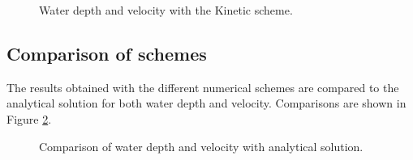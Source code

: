 \begin{figure}[H]
\begin{minipage}[t]{0.5\textwidth}
 \centering
\end{minipage}
\begin{minipage}[t]{0.5\textwidth}
 \centering
\end{minipage}
  \caption{Water depth and velocity with the Kinetic scheme.}
  \label{fig:stoker:firstobs1d}
\end{figure}

\subsection{Comparison of schemes}

The results obtained with the different numerical schemes are compared to the
analytical solution for both water depth and velocity.
Comparisons are shown in Figure \ref{fig:stoker:comparison}.

\begin{figure}[H]
\begin{minipage}[t]{0.5\textwidth}
 \centering
\end{minipage}
\begin{minipage}[t]{0.5\textwidth}
 \centering
\end{minipage}
\begin{minipage}[t]{0.5\textwidth}
 \centering
\end{minipage}
\begin{minipage}[t]{0.5\textwidth}
 \centering
\end{minipage}
\begin{minipage}[t]{0.5\textwidth}
 \centering
\end{minipage}
\begin{minipage}[t]{0.5\textwidth}
 \centering
\end{minipage}
  \caption{Comparison of water depth and velocity with analytical solution.}
  \label{fig:stoker:comparison}
\end{figure}


